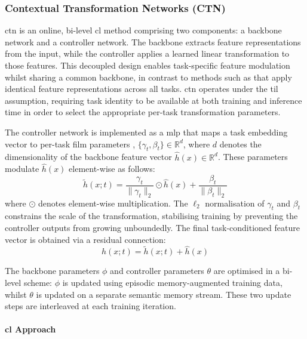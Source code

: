 \subsubsection{Contextual Transformation Networks (CTN)}

\gls{ctn} \cite{ctn_2021} is an online, bi-level \gls{cl} method comprising two
components: a backbone network and a controller network. The backbone extracts
feature representations from the input, while the controller applies a learned
linear transformation to those features. This decoupled design enables
task-specific feature modulation whilst sharing a common backbone, in contrast
to methods such as \cite{ll_lwf_2017, ll_ewc_2017} that apply identical feature
representations across all tasks. \gls{ctn} operates under the \gls{til}
assumption, requiring task identity to be available at both training and
inference time in order to select the appropriate per-task transformation
parameters.

The controller network is implemented as a \gls{mlp} that maps a task embedding
vector to per-task \gls{film} parameters \cite{2018_FiLM},
$\{\gamma_t, \beta_t\} \in \mathbb{R}^d$, where $d$ denotes the dimensionality
of the backbone feature vector $\hat{h}(x) \in \mathbb{R}^d$. These parameters
modulate $\hat{h}(x)$ element-wise as follows:
%
\begin{equation}\label{eqn:ctn_FiLM}
    \tilde{h}(x;t) = \frac{\gamma_t}{\|\gamma_t\|_2} \odot \hat{h}(x)
    + \frac{\beta_t}{\|\beta_t\|_2}
\end{equation}
%
where $\odot$ denotes element-wise multiplication. The $\ell_2$ normalisation
of $\gamma_t$ and $\beta_t$ constrains the scale of the transformation,
stabilising training by preventing the controller outputs from growing
unboundedly. The final task-conditioned feature vector is obtained via a
residual connection:
%
\begin{equation}\label{eqn:ctn_final_features}
    h(x;t) = \tilde{h}(x;t) + \hat{h}(x)
\end{equation}

The backbone parameters $\phi$ and controller parameters $\theta$ are optimised
in a bi-level scheme: $\phi$ is updated using episodic memory-augmented training
data, whilst $\theta$ is updated on a separate semantic memory stream. These two
update steps are interleaved at each training iteration.

\paragraph{\gls{cl} Approach}


